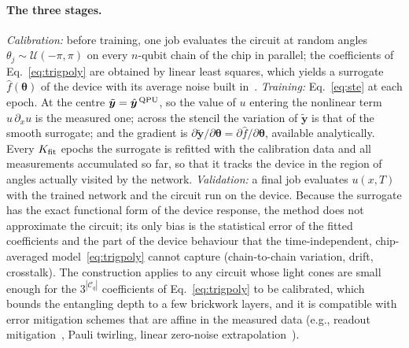 \documentclass[floatfix,aps,pra,twocolumn,superscriptaddress,10pt,nofootinbib]{revtex4-2}
\begin{document}
\begin{appendices}
\paragraph{The three stages.} \emph{Calibration:} before training, one job evaluates the circuit at random angles $\theta_j\sim\mathcal U(-\pi,\pi)$ on every $n$-qubit chain of the chip in parallel; the coefficients of Eq.~\eqref{eq:trigpoly} are obtained by linear least squares, which yields a surrogate $\hat f(\bm\theta)$ of the device with its average noise built in~\cite{sung2020using}. \emph{Training:} Eq.~\eqref{eq:ste} at each epoch. At the centre $\tilde{\bm y}=\hat{\bm y}^{\,\rm QPU}$, so the value of $u$ entering the nonlinear term $u\,\partial_xu$ is the measured one; across the stencil the variation of $\tilde{\bm y}$ is that of the smooth surrogate; and the gradient is $\partial\tilde{\bm y}/\partial\bm\theta=\partial\hat f/\partial\bm\theta$, available analytically. Every $K_{\rm fit}$ epochs the surrogate is refitted with the calibration data and all measurements accumulated so far, so that it tracks the device in the region of angles actually visited by the network. \emph{Validation:} a final job evaluates $u(x,T)$ with the trained network and the circuit run on the device. Because the surrogate has the exact functional form of the device response, the method does not approximate the circuit; its only bias is the statistical error of the fitted coefficients and the part of the device behaviour that the time-independent, chip-averaged model~\eqref{eq:trigpoly} cannot capture (chain-to-chain variation, drift, crosstalk). The construction applies to any circuit whose light cones are small enough for the $3^{|\mathcal C_q|}$ coefficients of Eq.~\eqref{eq:trigpoly} to be calibrated, which bounds the entangling depth to a few brickwork layers, and it is compatible with error mitigation schemes that are affine in the measured data (e.g., readout mitigation~\cite{vandenberg2022model}, Pauli twirling, linear zero-noise extrapolation~\cite{temme2017error}).


\end{appendices}
\end{document}
